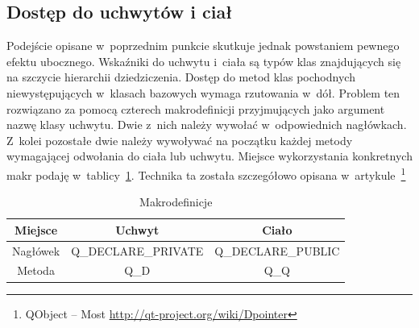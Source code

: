 \subsection{Dostęp do uchwytów i ciał}
Podejście opisane w~poprzednim punkcie skutkuje jednak powstaniem pewnego efektu ubocznego.
Wskaźniki do uchwytu i~ciała są typów klas znajdujących się na szczycie hierarchii dziedziczenia. Dostęp do metod klas pochodnych niewystępujących w~klasach bazowych wymaga rzutowania w~dół. 
Problem ten rozwiązano za pomocą czterech makrodefinicji przyjmujących jako argument nazwę klasy uchwytu. Dwie z~nich należy wywołać w~odpowiednich nagłówkach. Z~kolei pozostałe dwie należy wywoływać na początku każdej metody wymagającej odwołania do ciała lub uchwytu. Miejsce wykorzystania konkretnych makr podaję w~tablicy~\ref{tab:makra}. Technika ta została szczegółowo opisana w~artykule~\footnote{QObject -- Most \url{http://qt-project.org/wiki/Dpointer}}

\begin{table}[h]\footnotesize
\centering
\caption{Makrodefinicje}
\label{tab:makra}
\begin{tabular}{|c|c|c|}
\hline
Miejsce & Uchwyt & Ciało\\
\hline
Nagłówek & Q\_DECLARE\_PRIVATE & Q\_DECLARE\_PUBLIC\\
\hline
Metoda & Q\_D & Q\_Q\\
\hline
\end{tabular}
\end{table}
